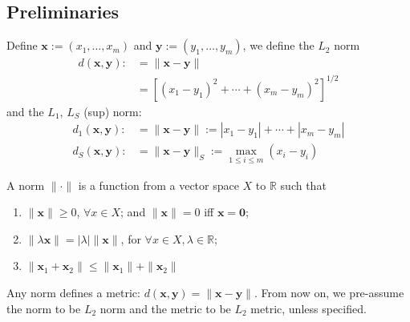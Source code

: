 \subsection{Preliminaries}
Define $\bm x:=(x_1,\dots,x_m)$ and $\bm y:=(y_1,\dots,y_m)$, we define the $L_2$ norm
\begin{align*}
d(\bm x,\bm y):&=\|\bm x-\bm y\|\\
&=\left[(x_1-y_1)^2+\cdots+(x_m-y_m)^2\right]^{1/2}
\end{align*}
and the $L_1$, $L_{S}$ (sup) norm:
\begin{align*}
d_1(\bm x,\bm y):&=\|\bm x-\bm y\|:=|x_1-y_1|+\cdots+|x_m-y_m|\\
d_S(\bm x,\bm y):&=\|\bm x-\bm y\|_S:=\max_{1\le i\le m}(x_i-y_i)
\end{align*}
\begin{definition}
A norm $\|\cdot\|$ is a function from a vector space $X$ to $\mathbb{R}$ such that
\begin{enumerate}
\item
$\|\bm x\|\ge0$, $\forall x\in X$; and $\|\bm x\|=0$ iff $\bm x=\bm0$;
\item
$\|\lambda\bm x\| = |\lambda|\|\bm x\|$, for $\forall x\in X,\lambda\in\mathbb{R}$;
\item
$\|\bm x_1+\bm x_2\|\le \|\bm x_1\| + \|\bm x_2\|$
\end{enumerate}
\end{definition}
\begin{remark}
Any norm defines a metric: $d(\bm x,\bm y)=\|\bm x-\bm y\|$. From now on, we pre-assume the norm to be $L_2$ norm and the metric to be $L_2$ metric, unless specified.
\end{remark}

